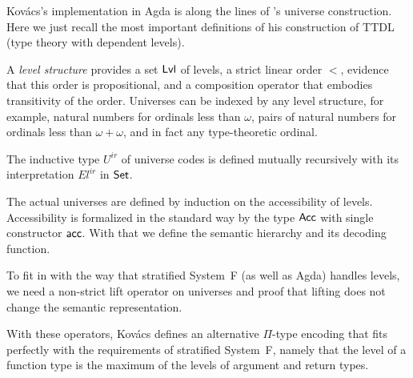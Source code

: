 \documentclass[manuscript,screen,review,anonymous]{acmart}
\begin{document}
{Kov\'{a}cs's implementation in Agda is along the lines of
\citet{mcbride15:_datat_datat}'s universe construction. Here we just
recall the most important definitions of his construction of TTDL
(type theory with dependent levels).

A \emph{level structure} provides a set $\ALvl$ of levels, a strict
linear order $<$, evidence that this order is propositional, and a
composition operator that embodies transitivity of the
order. Universes can be indexed by any level structure, for example,
natural numbers for ordinals less than $\omega$, pairs of natural
numbers for ordinals less than $\omega+\omega$, and in fact any
type-theoretic ordinal.

\ULvlStruct

The inductive type $U^{ir}$ of universe codes is defined mutually
recursively with its interpretation $El^{ir}$ in $\ASet$.

\begin{minipage}{0.45\linewidth}
\UUirSpec
\UUir  
\end{minipage}
\begin{minipage}{0.45\linewidth}
\UElirSpec
\UElir
\end{minipage}

The actual universes are defined by induction on the accessibility of
levels. Accessibility is formalized in the standard way by the type
$\AAcc$ with single constructor $\Aacc$.
\UUless
With that we define the semantic hierarchy and its decoding function.

\begin{minipage}{0.45\linewidth}
  \UU
\end{minipage}
\begin{minipage}{0.45\linewidth}
  \UEl
\end{minipage}

To fit in with the way that stratified System~F (as well as Agda)
handles levels, we need a non-strict lift operator on universes and
proof that lifting does not change the semantic representation.

\begin{minipage}{0.45\linewidth}
  \ULiftLe
\end{minipage}
\begin{minipage}{0.45\linewidth}
  \UElLiftLe
\end{minipage}

With these operators, Kov\'{a}cs defines an alternative $\Pi$-type encoding that fits perfectly
with the requirements of stratified System~F, namely that the level of
a function type is the maximum of the levels of argument and return types.
\UAltPi

}
\end{document}

